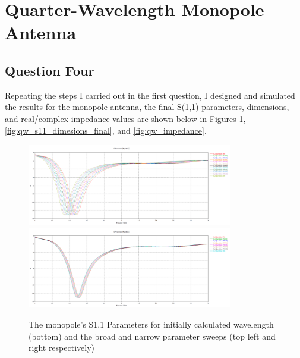 \documentclass[colorlinks,11pt,a4paper,normalphoto,withhyper,ragged2e]{altareport}
\begin{document}
\newpage



\section{Quarter-Wavelength Monopole Antenna}
\subsection{Question Four}

Repeating the steps I carried out in the first question, I designed and simulated the results for the monopole antenna, the final S(1,1) parameters, dimensions, and real/complex impedance values are shown below in Figures \ref{fig:qw_s11_params_init_sweeps}, \ref{fig:qw_s11_dimesions_final}, and \ref{fig:qw_impedance}.

\begin{figure}[h]
	\centering
	\hspace{\fill}\includegraphics[width=9cm,valign=c]{Images/qw-lambda-sweep-broad-S1,1.png}\hspace{\fill}\includegraphics[width=9cm,valign=c]{Images/qw-lambda-sweep-narrow-S1,1.png}\hspace{\fill}
	\caption{The monopole's S1,1 Parameters for initially calculated wavelength (bottom) and the broad and narrow parameter sweeps (top left and right respectively)}  %
	\label{fig:qw_s11_params_init_sweeps}
\end{figure}
\end{document}

